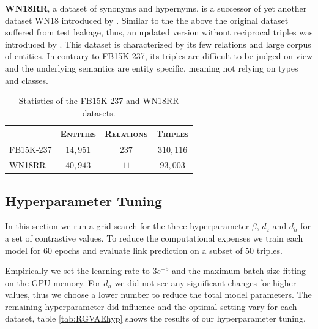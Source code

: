 

\textbf{WN18RR}, a dataset of synonyms and hypernyms, is a successor of yet another dataset WN18 introduced by \cite{bordes_translating_2013}. Similar to the the above the original dataset suffered from test leakage, thus, an updated version without reciprocal triples was introduced by \cite{dettmers_convolutional_2018}. This dataset is characterized by its few relations and large corpus of entities. In contrary to FB15K-237, its triples are difficult to be judged on view and the underlying semantics are entity specific, meaning not relying on types and classes.



\begin{table}[H]
  \centering
      \begin{tabular}{|l|l|l|l|}
      \hline
      \rowcolor[HTML]{EFEFEF}
      \multicolumn{1}{|c}{\textsc{Dataset}} & \multicolumn{1}{c}{\textsc{Entities}} & \multicolumn{1}{c}{\textsc{Relations}} & \multicolumn{1}{c|}{\textsc{Triples}}\\\hline
      FB15K-237     & \multicolumn{1}{c|}{$14,951$} & \multicolumn{1}{c|}{$237$} & \multicolumn{1}{c|}{$310,116$}\\
      WN18RR   & \multicolumn{1}{c|}{$40,943$} & \multicolumn{1}{c|}{$11$} & \multicolumn{1}{c|}{$93,003$} \\
      \hline
      \end{tabular}
      \caption{Statistics of the FB15K-237 \cite{toutanova_representing_2015} and WN18RR \cite{dettmers_convolutional_2018} datasets.}
      \label{tab5:data}
  \end{table}


\subsection{Hyperparameter Tuning}

In this section we run a grid search for the three hyperparameter $\beta$, $d_z$ and $d_h$ for a set of contrastive values. To reduce the computational expenses we train each model for $60$ epochs and  evaluate link prediction on a subset of $50$ triples.

Empirically we set the learning rate to $3e^{-5}$ and the maximum batch size fitting on the GPU memory. For $d_h$ we did not see any significant changes for higher values, thus we choose a lower number to reduce the total model parameters. The remaining hyperparameter did influence and the optimal setting vary for each dataset, table \ref{tab:RGVAEhyp} shows the results of our hyperparameter tuning.

